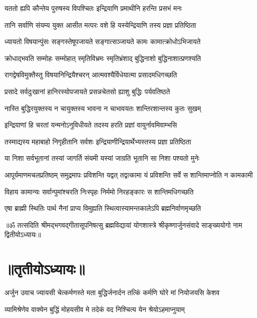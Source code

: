 \twolineshloka
{यततो ह्यपि कौन्तेय पुरुषस्य विपश्चितः}
{इन्द्रियाणि प्रमाथीनि हरन्ति प्रसभं मनः}%

\twolineshloka
{तानि सर्वाणि संयम्य युक्त आसीत मत्परः}
{वशे हि यस्येन्द्रियाणि तस्य प्रज्ञा प्रतिष्ठिता}%

\twolineshloka
{ध्यायतो विषयान्पुंसः सङ्गस्तेषूपजायते}
{सङ्गात्सञ्जायते कामः कामात्क्रोधोऽभिजायते}%

\twolineshloka
{क्रोधाद्भवति सम्मोहः सम्मोहात् स्मृतिविभ्रमः}
{स्मृतिभ्रंशाद् बुद्धिनाशो बुद्धिनाशात्प्रणश्यति}%

\twolineshloka
{रागद्वेषविमुक्तैस्तु विषयानिन्द्रियैश्चरन्}
{आत्मवश्यैर्विधेयात्मा प्रसादमधिगच्छति}%

\twolineshloka
{प्रसादे सर्वदुःखानां हानिरस्योपजायते}
{प्रसन्नचेतसो ह्याशु बुद्धिः पर्यवतिष्ठते}%

\twolineshloka
{नास्ति बुद्धिरयुक्तस्य न चायुक्तस्य भावना}
{न चाभावयतः शान्तिरशान्तस्य कुतः सुखम्}%

\twolineshloka
{इन्द्रियाणां हि चरतां यन्मनोऽनुविधीयते}
{तदस्य हरति प्रज्ञां वायुर्नावमिवाम्भसि}%

\twolineshloka
{तस्माद्यस्य महाबाहो निगृहीतानि सर्वशः}
{इन्द्रियाणीन्द्रियार्थेभ्यस्तस्य प्रज्ञा प्रतिष्ठिता}%

\twolineshloka
{या निशा सर्वभूतानां तस्यां जागर्ति संयमी}
{यस्यां जाग्रति भूतानि सा निशा पश्यतो मुनेः}%

\fourlineindentedshloka
{आपूर्यमाणमचलप्रतिष्ठम्}
{समुद्रमापः प्रविशन्ति यद्वत्}
{तद्वत्कामा यं प्रविशन्ति सर्वे}
{स शान्तिमाप्नोति न कामकामी}%

\twolineshloka
{विहाय कामान्यः सर्वान्पुमांश्चरति निःस्पृहः}
{निर्ममो निरहङ्कारः स शान्तिमधिगच्छति}%

\twolineshloka
{एषा ब्राह्मी स्थितिः पार्थ नैनां प्राप्य विमुह्यति}
{स्थित्वास्यामन्तकालेऽपि ब्रह्मनिर्वाणमृच्छति}%

{॥ॐ तत्सदिति श्रीमद्भगवद्गीतासूपनिषत्सु ब्रह्मविद्यायां योगशास्त्रे श्रीकृष्णार्जुनसंवादे साङ्ख्ययोगो नाम द्वितीयोऽध्यायः॥}

\section{॥तृतीयोऽध्यायः॥}

{अर्जुन उवाच}
\twolineshloka
{ज्यायसी चेत्कर्मणस्ते मता बुद्धिर्जनार्दन}
{तत्किं कर्मणि घोरे मां नियोजयसि केशव}%

\twolineshloka
{व्यामिश्रेणेव वाक्येन बुद्धिं मोहयसीव मे}
{तदेकं वद निश्चित्य येन श्रेयोऽहमाप्नुयाम्}%

